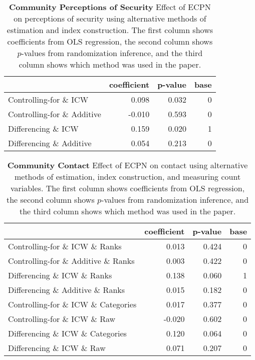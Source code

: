\documentclass[
]{article}
\begin{document}
\begin{table}[H]
\begin{center}
\label{tab:security_tab}
\caption{\textbf{Community Perceptions of Security} Effect of ECPN on perceptions of security using alternative methods of estimation and index construction. The first column shows coefficients from OLS regression, the second column shows $p$-values from randomization inference, and the third column shows which method was used in the paper.}
\smallskip

\begin{tabular}{l|r|r|r}
\hline
  & coefficient & p-value & base\\
\hline
Controlling-for \& ICW & 0.098 & 0.032 & 0\\
\hline
Controlling-for \& Additive & -0.010 & 0.593 & 0\\
\hline
Differencing \& ICW & 0.159 & 0.020 & 1\\
\hline
Differencing \& Additive & 0.054 & 0.213 & 0\\
\hline
\end{tabular}


\end{center}
\end{table}

\begin{table}[H]
\begin{center}
\label{tab:contact_tab}
\caption{\textbf{Community Contact} Effect of ECPN on contact using alternative methods of estimation, index construction, and measuring count variables. The first column shows coefficients from OLS regression, the second column shows $p$-values from randomization inference, and the third column shows which method was used in the paper.}
\smallskip

\begin{tabular}{l|r|r|r}
\hline
  & coefficient & p-value & base\\
\hline
Controlling-for \& ICW \& Ranks & 0.013 & 0.424 & 0\\
\hline
Controlling-for \& Additive \& Ranks & 0.003 & 0.422 & 0\\
\hline
Differencing \& ICW \& Ranks & 0.138 & 0.060 & 1\\
\hline
Differencing \& Additive \& Ranks & 0.015 & 0.182 & 0\\
\hline
Controlling-for \& ICW \& Categories & 0.017 & 0.377 & 0\\
\hline
Controlling-for \& ICW \& Raw & -0.020 & 0.602 & 0\\
\hline
Differencing \& ICW \& Categories & 0.120 & 0.064 & 0\\
\hline
Differencing \& ICW \& Raw & 0.071 & 0.207 & 0\\
\hline
\end{tabular}


\end{center}
\end{table}
\end{document}
